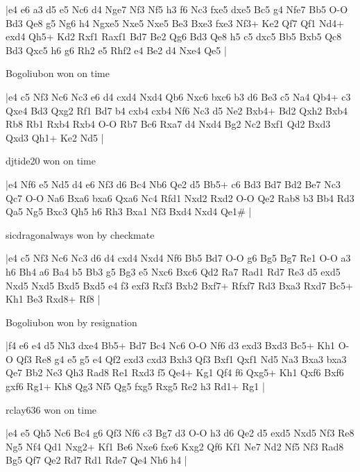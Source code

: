 \makegametitle
|e4 e6 a3 d5 e5 Nc6 d4 Nge7 Nf3 Nf5 h3 f6 Nc3 fxe5 dxe5 Bc5 g4 Nfe7 Bb5 O-O Bd3 Qe8 g5 Ng6 h4 Ngxe5 Nxe5 Nxe5 Be3 Bxe3 fxe3 Nf3+ Ke2 Qf7 Qf1 Nd4+ exd4 Qh5+ Kd2 Rxf1 Raxf1 Bd7 Be2 Qg6 Bd3 Qe8 h5 c5 dxc5 Bb5 Bxb5 Qc8 Bd3 Qxc5 h6 g6 Rh2 e5 Rhf2 e4 Be2 d4 Nxe4 Qe5  |

\showboard

Bogoliubon won on time

\makegametitle
|e4 c5 Nf3 Nc6 Nc3 e6 d4 cxd4 Nxd4 Qb6 Nxc6 bxc6 b3 d6 Be3 c5 Na4 Qb4+ c3 Qxe4 Bd3 Qxg2 Rf1 Bd7 b4 cxb4 cxb4 Nf6 Nc3 d5 Ne2 Bxb4+ Bd2 Qxh2 Bxb4 Rb8 Rb1 Rxb4 Rxb4 O-O Rb7 Bc6 Rxa7 d4 Nxd4 Bg2 Nc2 Bxf1 Qd2 Bxd3 Qxd3 Qh1+ Ke2 Nd5  |

\showboard

djtide20 won on time

\makegametitle
|e4 Nf6 e5 Nd5 d4 e6 Nf3 d6 Bc4 Nb6 Qe2 d5 Bb5+ c6 Bd3 Bd7 Bd2 Be7 Nc3 Qc7 O-O Na6 Bxa6 bxa6 Qxa6 Nc4 Rfd1 Nxd2 Rxd2 O-O Qe2 Rab8 b3 Bb4 Rd3 Qa5 Ng5 Bxc3 Qh5 h6 Rh3 Bxa1 Nf3 Bxd4 Nxd4 Qe1\#  |

\showboard

sicdragonalways won by checkmate

\makegametitle
|e4 c5 Nf3 Nc6 Nc3 d6 d4 cxd4 Nxd4 Nf6 Bb5 Bd7 O-O g6 Bg5 Bg7 Re1 O-O a3 h6 Bh4 a6 Ba4 b5 Bb3 g5 Bg3 e5 Nxc6 Bxc6 Qd2 Ra7 Rad1 Rd7 Re3 d5 exd5 Nxd5 Nxd5 Bxd5 Bxd5 e4 f3 exf3 Rxf3 Bxb2 Bxf7+ Rfxf7 Rd3 Bxa3 Rxd7 Bc5+ Kh1 Be3 Rxd8+ Rf8  |

\showboard

Bogoliubon won by resignation

\makegametitle
|f4 e6 e4 d5 Nh3 dxe4 Bb5+ Bd7 Bc4 Nc6 O-O Nf6 d3 exd3 Bxd3 Bc5+ Kh1 O-O Qf3 Re8 g4 e5 g5 e4 Qf2 exd3 cxd3 Bxh3 Qf3 Bxf1 Qxf1 Nd5 Na3 Bxa3 bxa3 Qe7 Bb2 Ne3 Qh3 Rad8 Re1 Rxd3 f5 Qe4+ Kg1 Qf4 f6 Qxg5+ Kh1 Qxf6 Bxf6 gxf6 Rg1+ Kh8 Qg3 Nf5 Qg5 fxg5 Rxg5 Re2 h3 Rd1+ Rg1  |

\showboard

rclay636 won on time

\makegametitle
|e4 e5 Qh5 Nc6 Bc4 g6 Qf3 Nf6 c3 Bg7 d3 O-O h3 d6 Qe2 d5 exd5 Nxd5 Nf3 Re8 Ng5 Nf4 Qd1 Nxg2+ Kf1 Be6 Nxe6 fxe6 Kxg2 Qf6 Kf1 Ne7 Nd2 Nf5 Nf3 Rad8 Bg5 Qf7 Qe2 Rd7 Rd1 Rde7 Qe4 Nh6 h4  |


